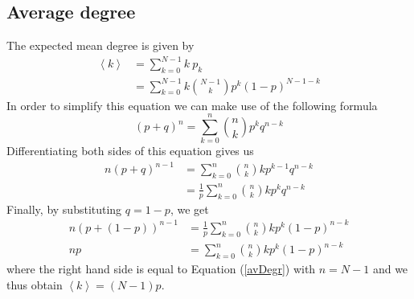 \documentclass[11 pt , letterpaper , twoside , openright]{book}
\begin{document}
\subsection{Average degree}\label{degree}
The expected mean degree is given by \cite{Hopcroft2006}
\begin{equation}\label{avDegr}
\begin{split}
	\left<k\right> &= \sum_{k=0}^{N-1} k\  p_k  \\
&= \sum_{k=0}^{N-1} k \binom{N-1}{k}p^k (1-p)^{N-1-k}
\end{split}
\end{equation}
In order to simplify this equation we can make use of the following formula \cite{Hopcroft2006}
\begin{equation} 
	(p+q)^n = \sum_{k=0}^n \binom{n}{k} p^k q^{n-k}
\end{equation}
Differentiating both sides of this equation gives us \cite{Hopcroft2006}
\begin{equation}
\begin{split}
	n(p+q)^{n-1} &= \sum_{k=0}^n \binom{n}{k} k p^{k-1} q^{n-k} \\
	&= \frac{1}{p} \sum_{k=0}^n \binom{n}{k} k p^{k} q^{n-k}
\end{split}
\end{equation}
Finally, by substituting $q = 1-p$, we get \cite{Hopcroft2006}
\begin{equation}
\begin{split}
	n (p+(1-p))^{n-1} &= \frac{1}{p} \sum_{k=0}^n \binom{n}{k} k p^{k} (1-p)^{n-k} \\
	np &= \sum_{k=0}^n \binom{n}{k} k p^{k} (1-p)^{n-k}
\end{split}
\end{equation}
where the right hand side is equal to Equation (\ref{avDegr}) with $n = N-1$ and we thus obtain $\left<k\right> = (N-1)p$.
\end{document}
